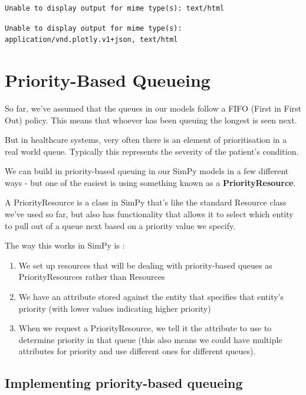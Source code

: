 \documentclass[
  letterpaper,
  DIV=11,
  numbers=noendperiod]{scrreprt}
\begin{document}
\begin{verbatim}
Unable to display output for mime type(s): text/html
\end{verbatim}

\begin{verbatim}
Unable to display output for mime type(s): application/vnd.plotly.v1+json, text/html
\end{verbatim}

\chapter{Priority-Based Queueing}\label{priority-based-queueing}

So far, we've assumed that the queues in our models follow a FIFO (First
in First Out) policy. This means that whoever has been queuing the
longest is seen next.

But in healthcare systems, very often there is an element of
prioritisation in a real world queue. Typically this represents the
severity of the patient's condition.

We can build in priority-based queuing in our SimPy models in a few
different ways - but one of the easiest is using something known as a
\textbf{PriorityResource}.

A PriorityResource is a class in SimPy that's like the standard Resource
class we've used so far, but also has functionality that allows it to
select which entity to pull out of a queue next based on a priority
value we specify.

The way this works in SimPy is :

\begin{enumerate}
\def\labelenumi{\arabic{enumi}.}
\item
  We set up resources that will be dealing with priority-based queues as
  PriorityResources rather than Resources
\item
  We have an attribute stored against the entity that specifies that
  entity's priority (with lower values indicating higher priority)
\item
  When we request a PriorityResource, we tell it the attribute to use to
  determine priority in that queue (this also means we could have
  multiple attributes for priority and use different ones for different
  queues).
\end{enumerate}

\section{Implementing priority-based
queueing}\label{implementing-priority-based-queueing}
\end{document}
